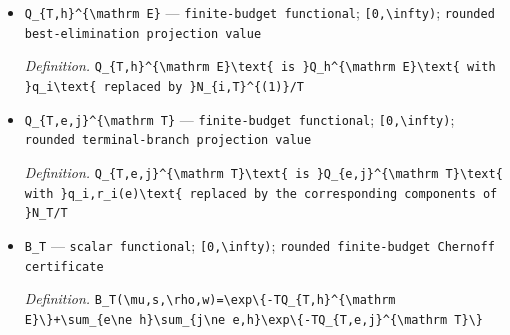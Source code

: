 \documentclass{article}
\begin{document}
\begin{itemize}
  \item \texttt{Q\_\allowbreak{}\{T,\allowbreak{}h\}\allowbreak{}\textasciicircum{}\{\textbackslash{}\allowbreak{}mathrm E\}\allowbreak{}} --- \texttt{finite-\allowbreak{}budget functional}; \texttt{[0,\allowbreak{}\textbackslash{}\allowbreak{}infty)}; \texttt{rounded best-\allowbreak{}elimination projection value}
  \par\smallskip\noindent\emph{Definition.} \texttt{Q\_\allowbreak{}\{T,\allowbreak{}h\}\allowbreak{}\textasciicircum{}\{\textbackslash{}\allowbreak{}mathrm E\}\allowbreak{}\textbackslash{}\allowbreak{}text\{ is \}\allowbreak{}Q\_\allowbreak{}h\textasciicircum{}\{\textbackslash{}\allowbreak{}mathrm E\}\allowbreak{}\textbackslash{}\allowbreak{}text\{ with \}\allowbreak{}q\_\allowbreak{}i\textbackslash{}\allowbreak{}text\{ replaced by \}\allowbreak{}N\_\allowbreak{}\{i,\allowbreak{}T\}\allowbreak{}\textasciicircum{}\{(1)\}\allowbreak{}/\allowbreak{}T}
  \item \texttt{Q\_\allowbreak{}\{T,\allowbreak{}e,\allowbreak{}j\}\allowbreak{}\textasciicircum{}\{\textbackslash{}\allowbreak{}mathrm T\}\allowbreak{}} --- \texttt{finite-\allowbreak{}budget functional}; \texttt{[0,\allowbreak{}\textbackslash{}\allowbreak{}infty)}; \texttt{rounded terminal-\allowbreak{}branch projection value}
  \par\smallskip\noindent\emph{Definition.} \texttt{Q\_\allowbreak{}\{T,\allowbreak{}e,\allowbreak{}j\}\allowbreak{}\textasciicircum{}\{\textbackslash{}\allowbreak{}mathrm T\}\allowbreak{}\textbackslash{}\allowbreak{}text\{ is \}\allowbreak{}Q\_\allowbreak{}\{e,\allowbreak{}j\}\allowbreak{}\textasciicircum{}\{\textbackslash{}\allowbreak{}mathrm T\}\allowbreak{}\textbackslash{}\allowbreak{}text\{ with \}\allowbreak{}q\_\allowbreak{}i,\allowbreak{}r\_\allowbreak{}i(e)\textbackslash{}\allowbreak{}text\{ replaced by the corresponding components of \}\allowbreak{}N\_\allowbreak{}T/\allowbreak{}T}
  \item \texttt{B\_\allowbreak{}T} --- \texttt{scalar functional}; \texttt{[0,\allowbreak{}\textbackslash{}\allowbreak{}infty)}; \texttt{rounded finite-\allowbreak{}budget Chernoff certificate}
  \par\smallskip\noindent\emph{Definition.} \texttt{B\_\allowbreak{}T(\textbackslash{}\allowbreak{}mu,\allowbreak{}s,\allowbreak{}\textbackslash{}\allowbreak{}rho,\allowbreak{}w)=\allowbreak{}\textbackslash{}\allowbreak{}exp\textbackslash{}\allowbreak{}\{-\allowbreak{}TQ\_\allowbreak{}\{T,\allowbreak{}h\}\allowbreak{}\textasciicircum{}\{\textbackslash{}\allowbreak{}mathrm E\}\allowbreak{}\textbackslash{}\allowbreak{}\}\allowbreak{}+\allowbreak{}\textbackslash{}\allowbreak{}sum\_\allowbreak{}\{e\textbackslash{}\allowbreak{}ne h\}\allowbreak{}\textbackslash{}\allowbreak{}sum\_\allowbreak{}\{j\textbackslash{}\allowbreak{}ne e,\allowbreak{}h\}\allowbreak{}\textbackslash{}\allowbreak{}exp\textbackslash{}\allowbreak{}\{-\allowbreak{}TQ\_\allowbreak{}\{T,\allowbreak{}e,\allowbreak{}j\}\allowbreak{}\textasciicircum{}\{\textbackslash{}\allowbreak{}mathrm T\}\allowbreak{}\textbackslash{}\allowbreak{}\}\allowbreak{}}

\end{itemize}
\end{document}
